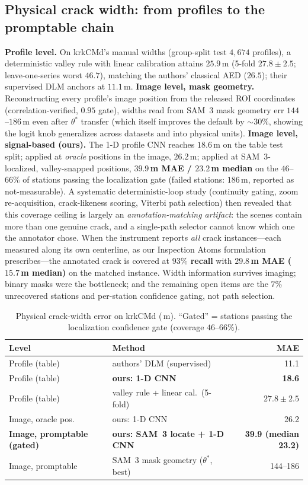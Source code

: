 \documentclass[11pt]{article}
\newcommand{\um}{\,\textmu m}
\begin{document}
\subsection{Physical crack width: from profiles to the promptable chain}\label{sec:signal}
\textbf{Profile level.} On krkCMd's manual widths (group-split test $4{,}674$ profiles),
a deterministic valley rule with linear calibration attains $25.9$\um{} (5-fold
$27.8\pm2.5$; leave-one-series worst $46.7$), matching the authors' classical AED
($26.5$); their supervised DLM anchors at $11.1$\um.
\textbf{Image level, mask geometry.} Reconstructing every profile's image position from
the released ROI coordinates (correlation-verified, $0.95$ gate), widths read from SAM~3
mask geometry err $144$--$186$\um{} even after $\theta^\ast$ transfer (which itself
improves the default by ${\sim}30\%$, showing the logit knob generalizes across datasets
and into physical units).
\textbf{Image level, signal-based (ours).} The 1-D profile CNN reaches $18.6$\um{} on the
table test split; applied at \emph{oracle} positions in the image, $26.2$\um; applied at
SAM~3-localized, valley-snapped positions, \textbf{$39.9$\um{} MAE / $23.2$\um{} median}
on the $46$--$66\%$ of stations passing the localization gate (failed stations: $186$\um,
reported as not-measurable). A systematic deterministic-loop study (continuity gating,
zoom re-acquisition, crack-likeness scoring, Viterbi path selection) then revealed that this
coverage ceiling is largely an \emph{annotation-matching artifact}: the scenes contain more
than one genuine crack, and a single-path selector cannot know which one the annotator chose.
When the instrument reports \emph{all} crack instances---each measured along its own
centerline, as our Inspection Atoms formulation prescribes---the annotated crack is covered
at \textbf{$93\%$ recall} with \textbf{$29.8$\um{} MAE ($15.7$\um{} median)} on the matched
instance. Width information survives imaging; binary masks were the bottleneck; and the
remaining open items are the $7\%$ unrecovered stations and per-station confidence gating,
not path selection.

\begin{table}[t]
\centering\small
\caption{Physical crack-width error on krkCMd (\um). ``Gated'' = stations passing the
localization confidence gate (coverage $46$--$66\%$).}
\label{tab:width}
\begin{tabular}{llr}
\toprule
Level & Method & MAE \\
\midrule
Profile (table) & authors' DLM (supervised) & 11.1 \\
Profile (table) & \textbf{ours: 1-D CNN} & \textbf{18.6} \\
Profile (table) & valley rule + linear cal.\ (5-fold) & $27.8\pm2.5$ \\
Image, oracle pos. & ours: 1-D CNN & 26.2 \\
\textbf{Image, promptable (gated)} & \textbf{ours: SAM~3 locate + 1-D CNN} & \textbf{39.9 (median 23.2)} \\
Image, promptable & SAM~3 mask geometry ($\theta^\ast$, best) & 144--186 \\
\bottomrule
\end{tabular}
\end{table}
\end{document}
